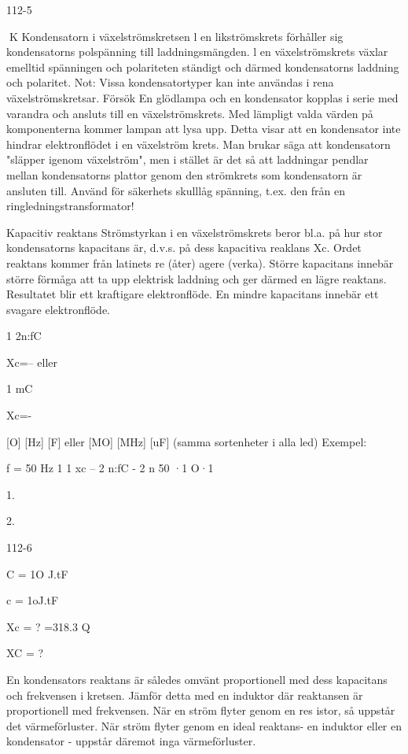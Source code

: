 112-5

K
Kondensatorn i växelströmskretsen
l en likströmskrets förhåller sig kondensatorns polspänning till laddningsmängden. l
en växelströmskrets växlar emelltid spänningen och polariteten ständigt och därmed
kondensatorns laddning och polaritet.
Not: Vissa kondensatortyper kan inte användas i rena växelströmskretsar.
Försök
En glödlampa och en kondensator kopplas i
serie med varandra och ansluts till en
växelströmskrets. Med lämpligt valda värden på komponenterna kommer lampan att
lysa upp.
Detta visar att en kondensator inte hindrar elektronflödet i en växelström krets. Man
brukar säga att kondensatorn "släpper igenom växelström", men i stället är det så att
laddningar pendlar mellan kondensatorns
plattor genom den strömkrets som kondensatorn är ansluten till.
Använd för säkerhets skulllåg spänning,
t.ex. den från en ringledningstransformator!

Kapacitiv reaktans
Strömstyrkan i en växelströmskrets beror
bl.a. på hur stor kondensatorns kapacitans
är, d.v.s. på dess kapacitiva reaklans Xc.
Ordet reaktans kommer från latinets re
(åter) agere (verka).
Större kapacitans innebär större förmåga att ta upp elektrisk laddning och ger
därmed en lägre reaktans. Resultatet blir ett
kraftigare elektronflöde. En mindre kapacitans innebär ett svagare elektronflöde.

1
2n:fC

Xc=-- eller

1
mC

Xc=-

[O]
[Hz]
[F]
eller
[MO]
[MHz]
[uF]
(samma sortenheter i alla led)
Exempel:

f = 50 Hz
1
1
xc -- 2 n:fC - 2 n 50 ·1 O·1

1.

2.

112-6

C = 1O J.tF

c = 1oJ.tF

Xc = ?
=318.3 Q

XC = ?

En kondensators reaktans är således
omvänt proportionell med dess kapacitans
och frekvensen i kretsen.
Jämför detta med en induktor där reaktansen är proportionell med frekvensen.
När en ström flyter genom en res istor, så
uppstår det värmeförluster. När ström flyter
genom en ideal reaktans- en induktor eller
en kondensator - uppstår däremot inga
värmeförluster.

